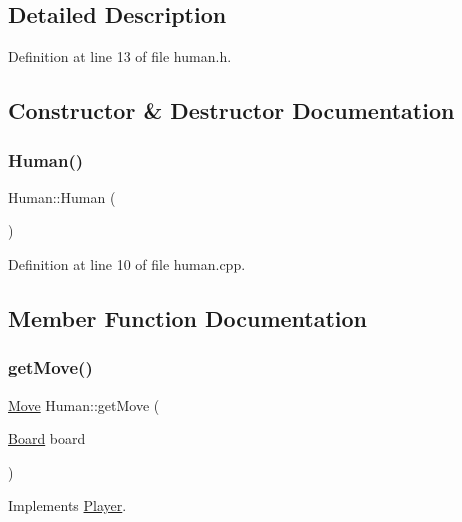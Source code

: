 \subsection{Detailed Description}


Definition at line 13 of file human.\+h.



\subsection{Constructor \& Destructor Documentation}
\mbox{\label{class_human_a4f84fcddcedd434023a001eba00a095c}} 
\subsubsection{\texorpdfstring{Human()}{Human()}}
{\footnotesize\ttfamily Human\+::\+Human (\begin{DoxyParamCaption}{ }\end{DoxyParamCaption})}



Definition at line 10 of file human.\+cpp.



\subsection{Member Function Documentation}
\mbox{\label{class_human_a61228d0fbea51c587ea5383d84b152d8}} 
\subsubsection{\texorpdfstring{get\+Move()}{getMove()}}
{\footnotesize\ttfamily \hyperlink{struct_move}{Move} Human\+::get\+Move (\begin{DoxyParamCaption}\item[{\hyperlink{constants_8h_af901d0acc1572fb0c779f84ddd2c6ce8}{Board}}]{board }\end{DoxyParamCaption})\hspace{0.3cm}{\ttfamily [virtual]}}



Implements \hyperlink{class_player_a97a516ce71ccef14123884b562c90e4c}{Player}.



